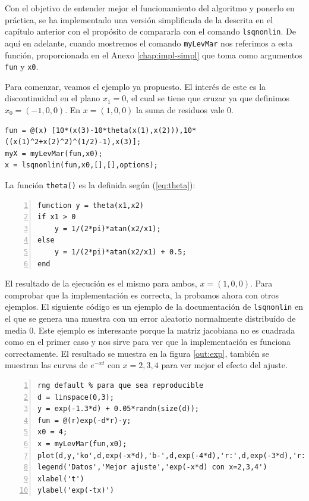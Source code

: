 \documentclass[11pt,a4paper]{book}
\theoremstyle{definition}
\theoremstyle{remark}
\def\code#1{\texttt{#1}}
\begin{document}
Con el objetivo de entender mejor el funcionamiento del algoritmo y ponerlo en práctica, se ha implementado una versión simplificada de la descrita en el capítulo anterior con el propósito de compararla con el comando \code{lsqnonlin}. De aquí en adelante, cuando mostremos el comando \code{myLevMar} nos referimos a esta función, proporcionada en el Anexo \ref{chap:impl-simpl} que toma como argumentos \code{fun} y \code{x0}.

Para comenzar, veamos el ejemplo ya propuesto. El interés de este es la discontinuidad en el plano $x_1=0$, el cual se tiene que cruzar ya que definimos $x_0=(-1,0,0)$. En $x=(1,0,0)$ la suma de residuos vale $0$.

\begin{lstlisting}[style=Matlab-editor]
fun = @(x) [10*(x(3)-10*theta(x(1),x(2))),10*((x(1)^2+x(2)^2)^(1/2)-1),x(3)];
myX = myLevMar(fun,x0);
x = lsqnonlin(fun,x0,[],[],options);
\end{lstlisting}
La función \code{theta()} es la definida según (\ref{eq:theta}):
\vspace{10pt}
\begin{lstlisting}[frame=single, numbers=left, style=Matlab-editor]
function y = theta(x1,x2)
if x1 > 0
	y = 1/(2*pi)*atan(x2/x1);
else
	y = 1/(2*pi)*atan(x2/x1) + 0.5;
end
\end{lstlisting}

El resultado de la ejecución es el mismo para ambos, $x=(1,0,0)$. Para comprobar que la
implementación es correcta, la probamos ahora con otros ejemplos. El siguiente código es un ejemplo de la documentación de \code{lsqnonlin}
\cite{lsqnonlin} en el que se genera una muestra con un error aleatorio normalmente distribuído de media $0$. Este ejemplo es interesante porque la matriz jacobiana no es cuadrada como en el primer caso y nos sirve para ver que la implementación es funciona correctamente. El resultado se muestra en la figura \ref{out:exp}, también se muestran las curvas de $e^{-xt}$ con $x=2,3,4$ para ver mejor el efecto del ajuste.
\vspace{10pt}
\begin{lstlisting}[frame=single, numbers=left, style=Matlab-editor]
rng default % para que sea reproducible
d = linspace(0,3);
y = exp(-1.3*d) + 0.05*randn(size(d));
fun = @(r)exp(-d*r)-y;
x0 = 4;
x = myLevMar(fun,x0);
plot(d,y,'ko',d,exp(-x*d),'b-',d,exp(-4*d),'r:',d,exp(-3*d),'r:',d,exp(-2*d),'r:')
legend('Datos','Mejor ajuste','exp(-x*d) con x=2,3,4')
xlabel('t')
ylabel('exp(-tx)')
\end{lstlisting}
\end{document}
